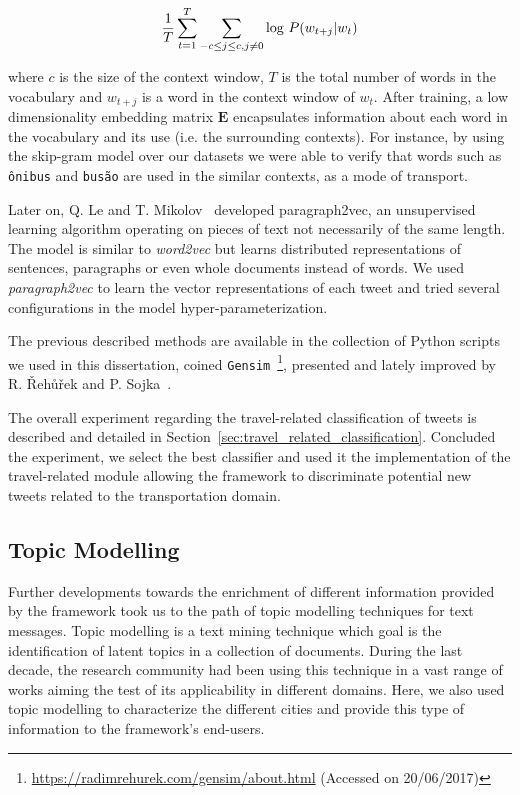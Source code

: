 \begin{equation}
\frac{1}{T}  \sum_{t=1}^{T}  \sum_{-c \leq j \leq  c, j \neq 0} \textnormal{log } P(w_{t+j} | w_t)
\end{equation}

where $c$ is the size of the context window, $T$ is the total number of words in the vocabulary and $w_{t+j}$ is a word in the context window of $w_t$. After training, a low dimensionality embedding matrix $\textbf{E}$ encapsulates information about each word in the vocabulary and its use (i.e. the surrounding contexts). For instance, by using the skip-gram model over our datasets we were able to verify that words such as \texttt{ônibus} and \texttt{busão} are used in the similar contexts, as a mode of transport.

Later on, Q. Le and T. Mikolov~\cite{le2014distributed} developed paragraph2vec, an unsupervised learning algorithm operating on pieces of text not necessarily of the same length. The model is similar to \emph{word2vec} but learns distributed representations of sentences, paragraphs or even whole documents instead of words. We used \emph{paragraph2vec} to learn the vector representations of each tweet and tried several configurations in the model hyper-parameterization.

The previous described methods are available in the collection of Python scripts we used in this dissertation, coined \texttt{Gensim}~\footnote{\url{https://radimrehurek.com/gensim/about.html} (Accessed on 20/06/2017)}, presented and lately improved by R. \v{R}eh\r{u}\v{r}ek and P. Sojka~\cite{rehurek2010software}.

The overall experiment regarding the travel-related classification of tweets is described and detailed in Section~\ref{sec:travel_related_classification}. Concluded the experiment, we select the best classifier and used it the implementation of the travel-related module allowing the framework to discriminate potential new tweets related to the transportation domain.

\subsection{Topic Modelling}\label{sec:topic_modelling}

Further developments towards the enrichment of different information provided by the framework took us to the path of topic modelling techniques for text messages. Topic modelling is a text mining technique which goal is the identification of latent topics in a collection of documents. During the last decade, the research community had been using this technique in a vast range of works aiming the test of its applicability in different domains. Here, we also used topic modelling to characterize the different cities and provide this type of information to the framework's end-users.


